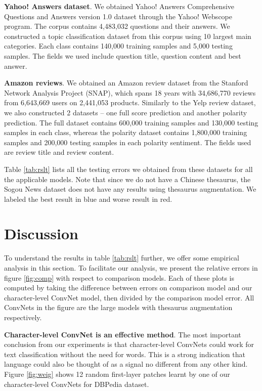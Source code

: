 \textbf{Yahoo! Answers dataset}. We obtained Yahoo! Answers Comprehensive Questions and Answers version 1.0 dataset through the Yahoo! Webscope program. The corpus contains 4,483,032 questions and their answers. We constructed a topic classification dataset from this corpus using 10 largest main categories. Each class contains 140,000 training samples and 5,000 testing samples. The fields we used include question title, question content and best answer.

\textbf{Amazon reviews}. We obtained an Amazon review dataset from the Stanford Network Analysis Project (SNAP), which spans 18 years with 34,686,770 reviews from 6,643,669 users on 2,441,053 products\cite{ML13}. Similarly to the Yelp review dataset, we also constructed 2 datasets -- one full score prediction and another polarity prediction. The full dataset contains 600,000 training samples and 130,000 testing samples in each class, whereas the polarity dataset contains 1,800,000 training samples and 200,000 testing samples in each polarity sentiment. The fields used are review title and review content.

Table \ref{tab:rslt} lists all the testing errors we obtained from these datasets for all the applicable models. Note that since we do not have a Chinese thesaurus, the Sogou News dataset does not have any results using thesaurus augmentation. We labeled the best result in blue and worse result in red.

\section{Discussion}

To understand the results in table \ref{tab:rslt} further, we offer some empirical analysis in this section. To facilitate our analysis, we present the relative errors in figure \ref{fig:comp} with respect to comparison models. Each of these plots is computed by taking the difference between errors on comparison model and our character-level ConvNet model, then divided by the comparison model error. All ConvNets in the figure are the large models with thesaurus augmentation respectively.

\textbf{Character-level ConvNet is an effective method}. The most important conclusion from our experiments is that character-level ConvNets could work for text classification without the need for words. This is a strong indication that language could also be thought of as a signal no different from any other kind. Figure \ref{fig:weig} shows 12 random first-layer patches learnt by one of our character-level ConvNets for DBPedia dataset.

